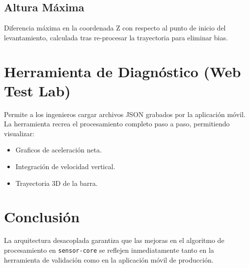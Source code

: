 \documentclass[11pt,a4paper,oneside]{article}
\begin{document}
\subsection{Altura Máxima}
Diferencia máxima en la coordenada Z con respecto al punto de inicio del levantamiento, calculada tras re-procesar la trayectoria para eliminar bias.

\section{Herramienta de Diagnóstico (Web Test Lab)}
Permite a los ingenieros cargar archivos JSON grabados por la aplicación móvil. La herramienta recrea el procesamiento completo paso a paso, permitiendo visualizar:
\begin{itemize}
    \item Graficos de aceleración neta.
    \item Integración de velocidad vertical.
    \item Trayectoria 3D de la barra.
\end{itemize}

\section{Conclusión}
La arquitectura desacoplada garantiza que las mejoras en el algoritmo de procesamiento en \texttt{sensor-core} se reflejen inmediatamente tanto en la herramienta de validación como en la aplicación móvil de producción.
\end{document}
